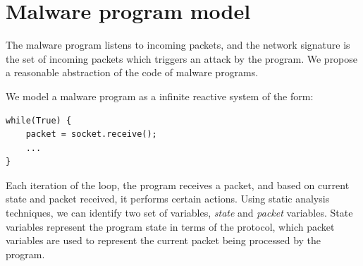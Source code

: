 \documentclass[twocolumn, 11pt]{paper}
\begin{document}
%
%

\section{Malware program model} \label{sec:malwaremodel}
The malware program listens to incoming packets, and the
network signature is the set of incoming packets which triggers
an attack by the program. We propose a reasonable abstraction
of the code of malware programs. 

We model a malware program as a infinite reactive system 
of the form:
\begin{lstlisting}	
while(True) {
	packet = socket.receive();
	...
}
\end{lstlisting}
Each iteration of the loop, the program receives a
packet, and based on current state and packet received,
it performs certain actions. Using static analysis
techniques, we can identify two set of variables, \emph{state}
and \emph{packet} variables. State variables represent the 
program state in 	terms of the protocol, which packet variables
are used to represent the current packet being processed by
the program.
\end{document}
